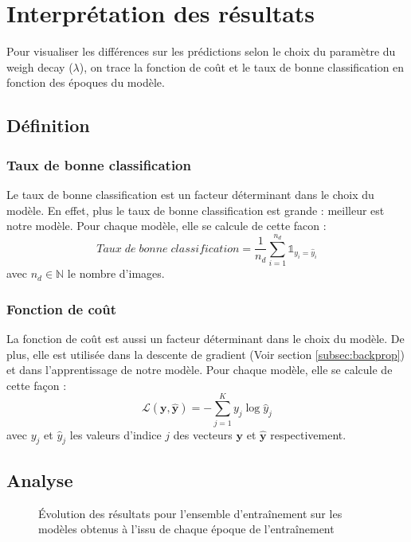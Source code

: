 \documentclass[12pt,english, openany]{book}
\begin{document}
\section{Interprétation des résultats}

Pour visualiser les différences sur les prédictions selon le choix du paramètre du weigh decay ($\lambda$), on trace la fonction de coût et le taux de bonne classification en fonction des époques du modèle.
\subsection{Définition}
\subsubsection{Taux de bonne classification}
Le taux de bonne classification est un facteur déterminant dans le choix du modèle. En effet, plus le taux de bonne classification est grande : meilleur est notre modèle. Pour chaque modèle, elle se calcule de cette facon :
$$
    Taux\; de\; bonne\; classification = \frac{1}{n_d}\sum_{i=1}^{n_d} \mathbb{1}_{y_i = \hat{y}_i}
$$
avec $n_d \in \mathbb N$ le nombre d'images.\\


\subsubsection{Fonction de coût}
La fonction de coût est aussi un facteur déterminant dans le choix du modèle. De plus, elle est utilisée dans la descente de gradient (Voir section \ref{subsec:backprop}) et dans l'apprentissage de notre modèle. Pour chaque modèle, elle se calcule de cette façon :
$$
\mathcal{L}(\mathbf{y}, \mathbf{\hat{y}}) = - \sum_{j = 1}^{K} y_{j} \log \hat{y}_{j} 
$$
avec $y_{j}$ et $\hat{y}_{j}$ les valeurs d'indice $j$ des vecteurs $\mathbf{y}$ et $\mathbf{\hat{y}}$ respectivement.

\subsection{Analyse}

\begin{figure}[H]
    \centering
  \hfill
  \hfill
  \hfill
  \caption{Évolution des résultats pour l'ensemble d'entraînement sur les modèles obtenus à l'issu de chaque époque de l'entraînement}
  \label{fig:result_train_epoque}
\end{figure}
\end{document}
